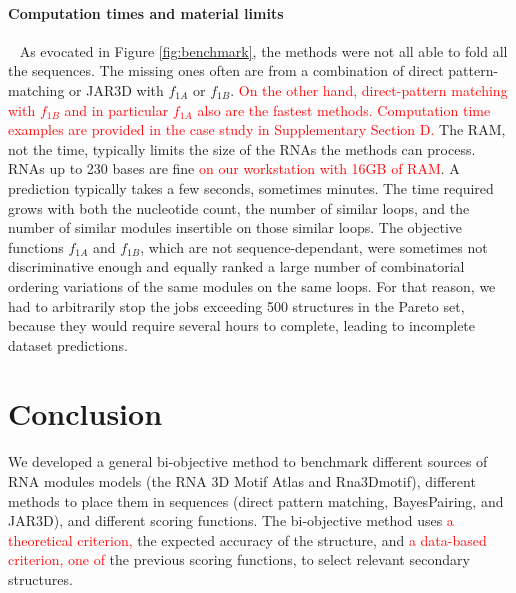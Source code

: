 \documentclass{bioinfo}
\begin{document}
\paragraph{Computation times and material limits} \label{sec:mat}~ 
As evocated in Figure \ref{fig:benchmark}, the methods were not all able to fold all the sequences. The missing ones often are from a combination of direct pattern-matching or JAR3D with $f_{1A}$ or $f_{1B}$. \textcolor{red}{On the other hand, direct-pattern matching with $f_{1B}$ and in particular $f_{1A}$ also are the fastest methods. Computation time examples are provided in the case study in Supplementary Section D.}
The RAM, not the time, typically limits the size of the RNAs the methods can process. RNAs up to 230 bases are fine \textcolor{red}{on our workstation with 16GB of RAM}. A prediction typically takes a few seconds, sometimes minutes. The time required grows with both the nucleotide count, the number of similar loops, and the number of similar modules insertible on those similar loops. The objective functions $f_{1A}$ and $f_{1B}$, which are not sequence-dependant, were sometimes not discriminative enough and equally ranked a large number of combinatorial ordering variations of the same modules on the same loops. For that reason, we had to arbitrarily stop the jobs exceeding 500 structures in the Pareto set, because they would require several hours to complete, leading to incomplete dataset predictions.

\vspace{-0.5cm}
\section{Conclusion}
We developed a general bi-objective method to benchmark different sources of RNA modules models (the RNA 3D Motif Atlas and Rna3Dmotif), different methods to place them in sequences (direct pattern matching, BayesPairing, and JAR3D), and different scoring functions. The bi-objective method uses \textcolor{red}{a theoretical criterion,} the expected accuracy of the structure, and \textcolor{red}{a data-based criterion, one of} the previous scoring functions, to select relevant secondary structures.
\end{document}
